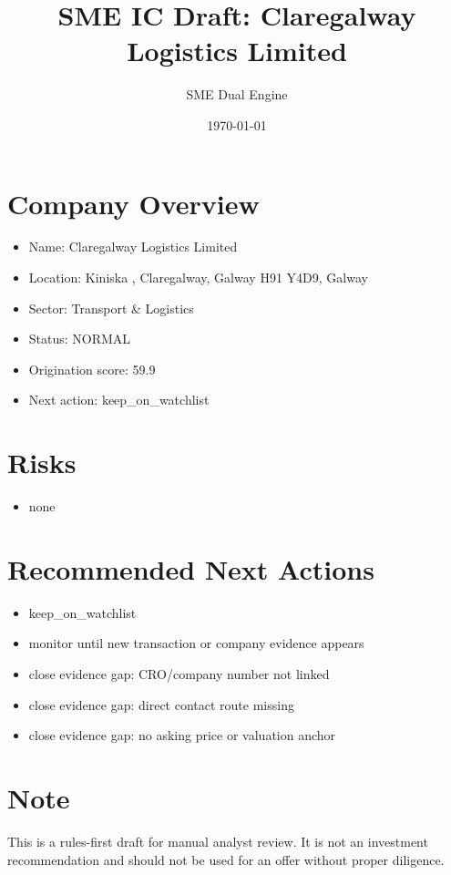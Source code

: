 \documentclass[11pt,a4paper]{article}
\title{SME IC Draft: Claregalway Logistics Limited}
\author{SME Dual Engine}
\date{\today}
\begin{document}
\maketitle
\section*{Company Overview}
\begin{itemize}[leftmargin=1.4em]
\item Name: Claregalway Logistics Limited
\item Location: Kiniska , Claregalway, Galway H91 Y4D9, Galway
\item Sector: Transport \& Logistics
\item Status: NORMAL
\item Origination score: 59.9
\item Next action: keep\_on\_watchlist
\end{itemize}
\section*{Risks}
\begin{itemize}[leftmargin=1.4em]
\item none
\end{itemize}
\section*{Recommended Next Actions}
\begin{itemize}[leftmargin=1.4em]
\item keep\_on\_watchlist
\item monitor until new transaction or company evidence appears
\item close evidence gap: CRO/company number not linked
\item close evidence gap: direct contact route missing
\item close evidence gap: no asking price or valuation anchor
\end{itemize}
\section*{Note}
This is a rules-first draft for manual analyst review. It is not an investment
recommendation and should not be used for an offer without proper diligence.
\end{document}
